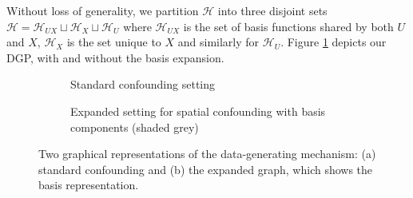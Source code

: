 \documentclass[
  12pt]{article}
\newcommand{\calH}{\mathcal{H}}
\begin{document}
Without loss of generality, we partition $\calH$  into three disjoint sets $\calH = \calH_{UX} \sqcup \calH_{X} \sqcup \calH_{U}$ where $\calH_{UX}$ is the set of basis functions shared by both $U$ and $X$, $\calH_X$ is the set unique to $X$ and similarly for $\calH_U$. Figure \ref{fig:dag-spatial} depicts our DGP, with and without the basis expansion. 
\begin{figure}[h]
\centering
\begin{subfigure}[t]{0.45\textwidth}
\centering
{}
\caption{Standard confounding setting }
\end{subfigure}
\hfill
\begin{subfigure}[t]{0.45\textwidth}
\centering
{}
\caption{Expanded setting for spatial confounding with basis components (shaded grey)}
\end{subfigure}

\caption{Two graphical representations of the data-generating mechanism: (a) standard confounding and (b) the expanded graph, which shows the basis representation.}
\label{fig:dag-spatial}
\end{figure}
\end{document}
